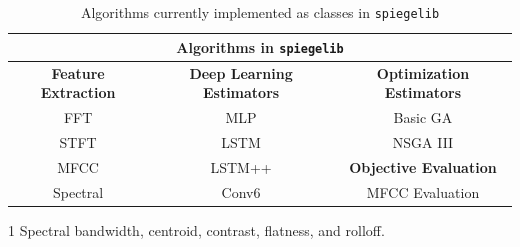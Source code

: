 
\begin{table}[t]
\centering\small
\begin{threeparttable}
	\caption{Algorithms currently implemented as classes in \texttt{spiegelib}}
	\label{table:spiegel_algorithms}
	\begin{tabular}{|c|c|c|}
	\hline
	\multicolumn{3}{|c|}{\textbf{Algorithms in \texttt{spiegelib}}} \\
	\hline
	\hline
	\textbf{Feature Extraction} & \textbf{Deep Learning Estimators} & \textbf{Optimization Estimators} \\
	\hline
	FFT 		& MLP \cite{yee2018automatic} 		& Basic GA   			\\
	STFT 		& LSTM \cite{yee2018automatic} 		& NSGA III \cite{tatar2016automatic}				\\\cline{3-3}
	MFCC		& LSTM++ \cite{yee2018automatic} 	& \textbf{Objective Evaluation} 	\\\cline{3-3}
	Spectral\tnote{1}	& Conv6 \cite{barkan2019inversynth} 	& MFCC Evaluation 		\\
	\hline
	\end{tabular}
	\begin{tablenotes}
			\footnotesize
			\item[1] Spectral bandwidth, centroid, contrast, flatness, and rolloff.
	\end{tablenotes}
\end{threeparttable}
\end{table}
 
